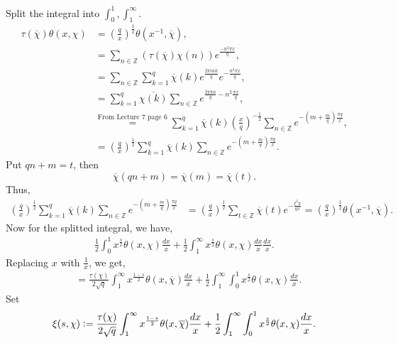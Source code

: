 \documentclass{article}
\newcommand{\defeq}{\vcentcolon=}
\newcommand{\Z}[0]{\mathbb{Z}}
\begin{document}
Split the integral into $\int_0^1,\int_1^\infty$.
\begin{align*}
  \tau(\overline{\chi})\theta(x,\chi) &= \left({\frac q x}\right)^{{\frac 1 2}}\theta(x^{-1},\overline{\chi}),\\
  & = \sum_{n\in\Z}(\tau(\overline{\chi})\chi(n))e^{{\frac {-n^2\pi x} q}},\\
  & = \sum_{n\in\Z}\sum_{k=1}^q\overline{\chi}(k)e^{{\frac {2\pi i nk} q}}e^{-{\frac {n^2\pi x} q}},\\
  & = \sum_{k=1}^q\overline{\chi(k)}\sum_{n\in\Z}e^{{\frac {2\pi kn} q} - n^2{\frac {\pi x} q}},\\
  &\stackrel{\text{From Lecture 7 page 6}}{=}\sum_{k=1}^q\overline{\chi}(k)\left({\frac x q}\right)^{-{\frac 1 2}}\sum_{n\in\Z}e^{-\left(m+{\frac m q}\right){\frac {\pi q} x}},\\
  & = \left({\frac q x}\right)^{{\frac 1 2}}\sum_{k=1}^q\overline{\chi}(k)\sum_{n\in\Z}e^{-\left(m+{\frac m q}\right){\frac {\pi q} x}}.
\end{align*}
Put $qn+m = t$, then 
\begin{equation*}
  \overline{\chi}(qn+m) = \overline{\chi}(m) = \overline{\chi}(t).
\end{equation*}
Thus,
\begin{align*}
  \left({\frac q x}\right)^{{\frac 1 2}}\sum_{k=1}^q\overline{\chi}(k)\sum_{n\in\Z}e^{-\left(m+{\frac m q}\right){\frac {\pi q} x}} & = \left({\frac q x}\right)^{\frac 1 2}\sum_{t\in\Z}\overline{\chi}(t)e^{-{\frac {t^2\pi} {qx}}}= \left({\frac q x}\right)^{{\frac 1 2}}\theta(x^{-1},\overline{\chi}).
\end{align*}
Now for the splitted integral, we have,
\begin{align*}
  {\frac 1 2}\int_0^1x^{{\frac s 2}}\theta(x,\chi){\frac {dx} x}+{\frac 1 2}\int_1^\infty x^{{\frac s 2}}\theta(x,\chi){\frac {dx} x}{\frac {dx} x}.
\end{align*}
Replacing $x$ with ${\frac 1 x}$, we get, 
\begin{align*}
  & = {\frac {\tau(\chi)} {2\sqrt{q}}}\int_1^\infty x^{{\frac {1-s} 2}}\theta(x,\overline{\chi}){\frac {dx} x}+{\frac 1 2}\int_1^\infty \int_0^1x^{{\frac s 2}}\theta(x,\chi){\frac {dx} x}.
\end{align*}
Set 
\begin{equation*}
  \xi(s,\chi) \defeq {\frac {\tau(\chi)} {2\sqrt{q}}}\int_1^\infty x^{{\frac {1-s} 2}}\theta(x,\overline{\chi}){\frac {dx} x}+{\frac 1 2}\int_1^\infty \int_0^1x^{{\frac s 2}}\theta(x,\chi){\frac {dx} x}.
\end{equation*}
\end{document}
